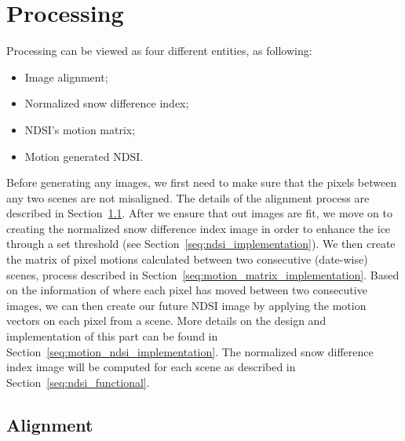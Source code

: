 \documentclass[11pt, a4paper]{report}
\begin{document}
	\section{Processing}
	\label{seq:processing}
	Processing can be viewed as four different entities, as following:
	\begin{itemize}
		\item Image alignment;
		\item Normalized snow difference index;
		\item NDSI's motion matrix;
		\item Motion generated NDSI.
	\end{itemize}
	Before generating any images, we first need to make sure that the pixels between any two scenes are not misaligned. The details of the alignment process are described in Section~\ref{seq:alignment_implementation}. After we ensure that out images are fit, we move on to creating the normalized snow difference index image in order to enhance the ice through a set threshold (see Section~\ref{seq:ndsi_implementation}). We then create the matrix of pixel motions calculated between two consecutive (date-wise) scenes, process described in Section~\ref{seq:motion_matrix_implementation}. Based on the information of where each pixel has moved between two consecutive images, we can then create our future NDSI image by applying the motion vectors on each pixel from a scene. More details on the design and implementation of this part can be found in Section~\ref{seq:motion_ndsi_implementation}.
	The normalized snow difference index image will be computed for each scene as described in Section~\ref{seq:ndsi_functional}.
	
	
	\subsection{Alignment}
	\label{seq:alignment_implementation}
	
\end{document}

